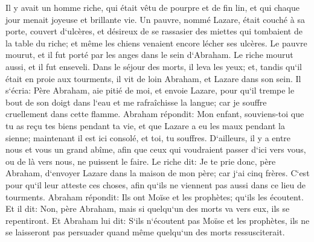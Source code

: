 \verse Il y avait un homme riche, qui était vêtu de pourpre et de fin lin, et qui chaque jour menait joyeuse et brillante vie. 
\verse Un pauvre, nommé Lazare, était couché à sa porte, couvert d`ulcères, 
\verse et désireux de se rassasier des miettes qui tombaient de la table du riche; et même les chiens venaient encore lécher ses ulcères. 
\verse Le pauvre mourut, et il fut porté par les anges dans le sein d`Abraham. Le riche mourut aussi, et il fut enseveli. 
\verse Dans le séjour des morts, il leva les yeux; et, tandis qu`il était en proie aux tourments, il vit de loin Abraham, et Lazare dans son sein. 
\verse Il s`écria: Père Abraham, aie pitié de moi, et envoie Lazare, pour qu`il trempe le bout de son doigt dans l`eau et me rafraîchisse la langue; car je souffre cruellement dans cette flamme. 
\verse Abraham répondit: Mon enfant, souviens-toi que tu as reçu tes biens pendant ta vie, et que Lazare a eu les maux pendant la sienne; maintenant il est ici consolé, et toi, tu souffres. 
\verse D`ailleurs, il y a entre nous et vous un grand abîme, afin que ceux qui voudraient passer d`ici vers vous, ou de là vers nous, ne puissent le faire. 
\verse Le riche dit: Je te prie donc, père Abraham, d`envoyer Lazare dans la maison de mon père; car j`ai cinq frères. 
\verse C`est pour qu`il leur atteste ces choses, afin qu`ils ne viennent pas aussi dans ce lieu de tourments. 
\verse Abraham répondit: Ils ont Moïse et les prophètes; qu`ils les écoutent. 
\verse Et il dit: Non, père Abraham, mais si quelqu`un des morts va vers eux, ils se repentiront. 
\verse Et Abraham lui dit: S`ils n`écoutent pas Moïse et les prophètes, ils ne se laisseront pas persuader quand même quelqu`un des morts ressusciterait. 

